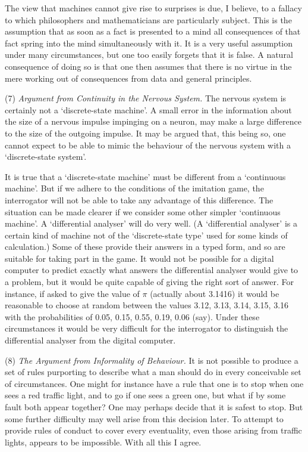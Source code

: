 \documentclass[10pt]{article} %
\begin{document}
The view that machines cannot give rise to surprises is due, I believe, to a fallacy to which philosophers and mathematicians are particularly subject. This is the assumption that as soon as a fact is presented to a mind all consequences of that fact spring into the mind simultaneously with it. It is a very useful assumption under many circumstances, but one too easily forgets that it is false. A natural consequence of doing so is that one then assumes that there is no virtue in the mere working out of consequences from data and general principles.
\vspace{0.5\baselineskip} %

\noindent\normalfont (7) \textit{Argument from Continuity in the Nervous System.} The nervous system is certainly not a `discrete-state machine'. A small error in the information about the size of a nervous impulse impinging on a neuron, may make a large difference to the size of the outgoing impulse. It may be argued that, this being so, one cannot expect to be able to mimic the behaviour of the nervous system with a `discrete-state system'.

It is true that a `discrete-state machine' must be different from a `continuous machine'. But if we adhere to the conditions of the imitation game, the interrogator will not be able to take any advantage of this difference. The situation can be made clearer if we consider some other simpler `continuous machine'. A `differential analyser' will do very well. (A `differential analyser' is a certain kind of machine not of the `discrete-state type' used for some kinds of calculation.) Some of these provide their answers in a typed form, and so are suitable for taking part in the game. It would not be possible for a digital computer to predict exactly what answers the differential analyser would give to a problem, but it would be quite capable of giving the right sort of answer. For instance, if asked to give the value of $\pi$ (actually about 3.1416) it would be reasonable to choose at random between the values 3.12, 3.13, 3.14, 3.15, 3.16 with the probabilities of 0.05, 0.15, 0.55, 0.19, 0.06 (say). Under these circumstances it would be very difficult for the interrogator to distinguish the differential analyser from the digital computer.

\vspace{0.5\baselineskip} %
\noindent\normalfont (8) \textit{The Argument from Informality of Behaviour.} It is not possible to produce a set of rules purporting to describe what a man should do in every conceivable set of circumstances. One might for instance have a rule that one is to stop when one sees a red traffic light, and to go if one sees a green one, but what if by some fault both appear together? One may perhaps decide that it is safest to stop. But some further difficulty may well arise from this decision later. To attempt to provide rules of conduct to cover every eventuality, even those arising from traffic lights, appears to be impossible. With all this I agree.
\end{document}
